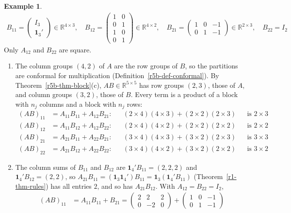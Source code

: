 \documentclass[12pt]{article}
\newcommand{\R}{\mathbb R}
\newcommand{\one}{\mathbf 1}
\theoremstyle{definition}
\newtheorem{example}[theorem]{Example}
\begin{document}
\begin{example}
\[\begin{gathered}
B_{11}=\begin{pmatrix}I_3\\\one_3'\end{pmatrix}\in\R^{4\times3},\quad
B_{12}=\begin{pmatrix}1&0\\0&1\\1&0\\0&1\end{pmatrix}\in\R^{4\times2},\quad
B_{21}=\begin{pmatrix}1&0&-1\\0&1&-1\end{pmatrix}\in\R^{2\times3},\quad B_{22}=I_2
\end{gathered}
\]
Only \(A_{12}\) and \(B_{22}\) are square.
\begin{enumerate}
\item The column groups \((4,2)\) of \(A\) are the row groups of \(B\), so the partitions are
conformal for multiplication (Definition~\ref{r5b-def-conformal}). By
Theorem~\ref{r5b-thm-block}(c), \(AB\in\R^{5\times5}\) has row groups \((2,3)\), those of \(A\),
and column groups \((3,2)\), those of \(B\). Every term is a product of a block with \(n_j\) columns
and a block with \(n_j\) rows:
\[
\begin{aligned}
(AB)_{11}&=A_{11}B_{11}+A_{12}B_{21}:&&(2\times4)(4\times3)+(2\times2)(2\times3)&&\text{is }2\times3\\
(AB)_{12}&=A_{11}B_{12}+A_{12}B_{22}:&&(2\times4)(4\times2)+(2\times2)(2\times2)&&\text{is }2\times2\\
(AB)_{21}&=A_{21}B_{11}+A_{22}B_{21}:&&(3\times4)(4\times3)+(3\times2)(2\times3)&&\text{is }3\times3\\
(AB)_{22}&=A_{21}B_{12}+A_{22}B_{22}:&&(3\times4)(4\times2)+(3\times2)(2\times2)&&\text{is }3\times2
\end{aligned}
\]
\item The column sums of \(B_{11}\) and \(B_{12}\) are \(\one_4'B_{11}=(2,2,2)\) and
\(\one_4'B_{12}=(2,2)\), so \(A_{21}B_{11}=(\one_3\one_4')B_{11}=\one_3(\one_4'B_{11})\) (Theorem~\ref{r1-thm-rules}) has all entries \(2\), and so
has \(A_{21}B_{12}\). With \(A_{12}=B_{22}=I_2\),
\[
\begin{aligned}
(AB)_{11}&=A_{11}B_{11}+B_{21}=\begin{pmatrix}2&2&2\\0&-2&0\end{pmatrix}+\begin{pmatrix}1&0&-1\\0&1&-1\end{pmatrix}

\end{aligned}\]
\end{enumerate}
\end{example}
\end{document}
